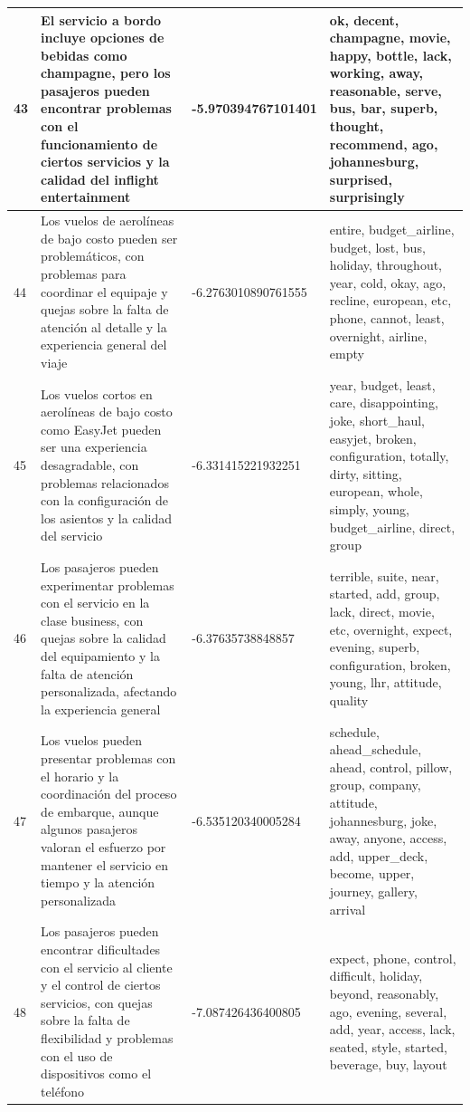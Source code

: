 \documentclass{report}
\begin{document}
\begin{longtable}{|p{1cm}|p{4cm}|p{4cm}|p{6cm}|}
                    \hline
                    43 & El servicio a bordo incluye opciones de bebidas como champagne, pero los pasajeros pueden encontrar problemas con el funcionamiento de ciertos servicios y la calidad del inflight entertainment & -5.970394767101401 & ok, decent, champagne, movie, happy, bottle, lack, working, away, reasonable, serve, bus, bar, superb, thought, recommend, ago, johannesburg, surprised, surprisingly \\
                    \hline
                    44 & Los vuelos de aerolíneas de bajo costo pueden ser problemáticos, con problemas para coordinar el equipaje y quejas sobre la falta de atención al detalle y la experiencia general del viaje & -6.2763010890761555 & entire, budget\_airline, budget, lost, bus, holiday, throughout, year, cold, okay, ago, recline, european, etc, phone, cannot, least, overnight, airline, empty \\
                    \hline
                    45 & Los vuelos cortos en aerolíneas de bajo costo como EasyJet pueden ser una experiencia desagradable, con problemas relacionados con la configuración de los asientos y la calidad del servicio & -6.331415221932251 & year, budget, least, care, disappointing, joke, short\_haul, easyjet, broken, configuration, totally, dirty, sitting, european, whole, simply, young, budget\_airline, direct, group \\
                    \hline
                    46 & Los pasajeros pueden experimentar problemas con el servicio en la clase business, con quejas sobre la calidad del equipamiento y la falta de atención personalizada, afectando la experiencia general & -6.37635738848857 & terrible, suite, near, started, add, group, lack, direct, movie, etc, overnight, expect, evening, superb, configuration, broken, young, lhr, attitude, quality \\
                    \hline
                    47 & Los vuelos pueden presentar problemas con el horario y la coordinación del proceso de embarque, aunque algunos pasajeros valoran el esfuerzo por mantener el servicio en tiempo y la atención personalizada & -6.535120340005284 & schedule, ahead\_schedule, ahead, control, pillow, group, company, attitude, johannesburg, joke, away, anyone, access, add, upper\_deck, become, upper, journey, gallery, arrival \\
                    \hline
                    48 & Los pasajeros pueden encontrar dificultades con el servicio al cliente y el control de ciertos servicios, con quejas sobre la falta de flexibilidad y problemas con el uso de dispositivos como el teléfono & -7.087426436400805 & expect, phone, control, difficult, holiday, beyond, reasonably, ago, evening, several, add, year, access, lack, seated, style, started, beverage, buy, layout \\

\end{longtable}
\end{document}

